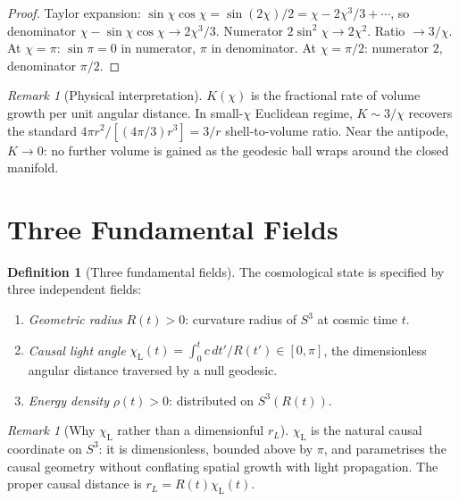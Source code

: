 \documentclass[12pt,a4paper]{amsart}
\theoremstyle{plain}
\theoremstyle{definition}
\newtheorem{definition}[theorem]{Definition}
\theoremstyle{remark}
\newtheorem{remark}[theorem]{Remark}
\newcommand{\Sthree}{S^3}
\newcommand{\chiL}{\chi_{\mathrm{L}}}
\begin{document}
\begin{proof}
  Taylor expansion: $\sin\chi\cos\chi=\sin(2\chi)/2=\chi-2\chi^3/3+\cdots$,
  so denominator $\chi-\sin\chi\cos\chi\to 2\chi^3/3$. Numerator
  $2\sin^2\!\chi\to 2\chi^2$. Ratio $\to 3/\chi$.
  At $\chi=\pi$: $\sin\pi=0$ in numerator, $\pi$ in denominator.
  At $\chi=\pi/2$: numerator $2$, denominator $\pi/2$.
\end{proof}

\begin{remark}[Physical interpretation]
  $K(\chi)$ is the fractional rate of volume growth per unit angular
  distance. In small-$\chi$ Euclidean regime, $K\sim 3/\chi$ recovers
  the standard $4\pi r^2/[(4\pi/3)r^3]=3/r$ shell-to-volume ratio.
  Near the antipode, $K\to 0$: no further volume is gained as the
  geodesic ball wraps around the closed manifold.
\end{remark}

\section{Three Fundamental Fields}
\label{sec:fields}

\begin{definition}[Three fundamental fields]
  \label{def:fields}
  The cosmological state is specified by three independent fields:
  \begin{enumerate}[label=\textbf{(F\arabic*)},noitemsep]
  \item \emph{Geometric radius} $R(t)>0$: curvature radius of $\Sthree$
    at cosmic time $t$.
  \item \emph{Causal light angle}
    $\chiL(t) = \int_0^t c\,dt'/R(t')\in[0,\pi]$, the dimensionless
    angular distance traversed by a null geodesic.
  \item \emph{Energy density} $\rho(t)>0$: distributed on $\Sthree(R(t))$.
  \end{enumerate}
\end{definition}

\begin{remark}[Why $\chiL$ rather than a dimensionful $r_L$]
  $\chiL$ is the natural causal coordinate on $\Sthree$: it is
  dimensionless, bounded above by $\pi$, and parametrises the causal
  geometry without conflating spatial growth with light propagation.
  The proper causal distance is $r_L=R(t)\chiL(t)$.
\end{remark}
\end{document}
